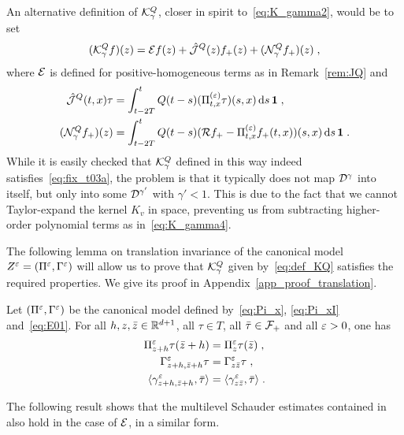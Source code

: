 \documentclass[reqno,11pt]{article}
\def\unit{\vone}
\def\JQhat{\hat\cJ^Q}
\begin{document}
\begin{remark}
\label{rem:JQhat}
An alternative definition of ${\mathcal K}^Q_\gamma$, closer in spirit
to~\eqref{eq:K_gamma2}, would be to set 
\[
 (\cK^Q_\gamma f)(z) = \cE f(z) + \JQhat(z)f_+(z) + (\cN_\gamma^Qf_+)(z)\;,  
\]
where ${\mathcal E}$ is defined for positive-homogeneous terms as in Remark~\ref{rem:JQ}
and 
\begin{align*}
\JQhat(t,x)\tau &= \int_{t-2T}^t
Q(t-s)(\Pi^{(\eps)}_{t,x}\tau)(s,x)\6s\,\unit\;, \\
(\cN_\gamma^Qf_+)(z) &= \int_{t-2T}^t Q(t-s)(\cR f_+
- \Pi^{(\eps)}_{t,x}f_+(t,x))(s,x)\6s\,\unit\;.
\end{align*}
While it is easily checked that ${\mathcal K}^Q_\gamma$ defined in this way indeed
satisfies~\eqref{eq:fix_t03a}, the problem is that it typically does not map
${\mathcal D}^\gamma$ into itself, but only into some ${\mathcal D}^{\gamma'}$ with $\gamma'<1$.
This is due to the fact that we cannot Taylor-expand the kernel $K_v$ in space,
preventing us from subtracting higher-order polynomial terms as
in~\eqref{eq:K_gamma4}.
\end{remark}

The following lemma on translation invariance of the canonical model
$Z^\varepsilon=(\Pi^\varepsilon,\Gamma^\varepsilon)$ will allow us to prove that ${\mathcal K}^Q_\gamma$ given
by~\eqref{eq:def_KQ} satisfies the required properties. We give its proof in
Appendix~\ref{app_proof_translation}.

\begin{lemma}
\label{lem_trans_inv}
Let $(\Pi^\varepsilon,\Gamma^\varepsilon)$ be the canonical model defined
by~\eqref{eq:Pi_x}, \eqref{eq:Pi_xI} and~\eqref{eq:E01}.
For all $h, z, \bar z\in\mathbb{R}^{d+1}$, all $\tau\in T$, all $\bar\tau\in{\mathcal F}_+$ and
all $\varepsilon>0$, one has
\begin{align}
\nonumber
\Pi^\eps_{z+h}\tau(\bar z+h) &= \Pi^\eps_z\tau(\bar z)\;, \\
\nonumber
\Gamma^\eps_{z+h,\bar z+h} \tau &= \Gamma^\eps_{z\bar z}\tau\;, \\
\pscal{\gamma^\eps_{z+h,\bar z+h}}{\bar \tau} &= \pscal{\gamma^\eps_{z\bar
z}}{\bar \tau}\;.
\label{eq:translation}
\end{align}
\end{lemma}

The following result shows that the multilevel Schauder estimates contained
in~\cite[Thm.~5.12]{Hairer2014} also hold in the case of ${\mathcal E}$, in a similar
form. 
\end{document}
